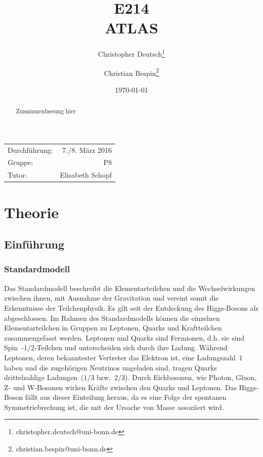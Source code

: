 \documentclass[11pt, a4paper]{article}
\title{E214 \\ ATLAS}
\author{Christopher Deutsch\footnote{christopher.deutsch@uni-bonn.de} \and Christian Bespin\footnote{christian.bespin@uni-bonn.de}}
\date{\today}
\numberwithin{equation}{section}
\begin{document}
\begin{titlepage}

\maketitle

\begin{center}
\begin{tabular}{l r}
Durchführung: & 7./8. März 2016 \\
Gruppe: & P8 \\
Tutor: & Elisabeth Schopf
\end{tabular}
\end{center}

\begin{abstract}
\noindent Zusammenfassung hier
\end{abstract}

\end{titlepage}

\tableofcontents
\newpage

\section{Theorie}

\subsection{Einführung}

\subsubsection{Standardmodell}

Das Standardmodell beschreibt die Elementarteilchen und die Wechselwirkungen zwischen ihnen, mit Ausnahme der Gravitation und vereint somit die Erkenntnisse der Teilchenphysik.
Es gilt seit der Entdeckung des Higgs-Bosons als abgeschlossen.
Im Rahmen des Standardmodells können die einzelnen Elementarteilchen in Gruppen zu Leptonen, Quarks und Kraftteilchen zusammengefasst werden.
Leptonen und Quarks sind Fermionen, d.h. sie sind Spin~-$1/2$-Teilchen und unterscheiden sich durch ihre Ladung.
Während Leptonen, deren bekanntester Vertreter das Elektron ist, eine Ladungszahl~$1$ haben und die zugehörigen Neutrinos ungeladen sind, tragen Quarks drittelzahlige Ladungen~($1/3$ bzw.~$2/3$).
Durch Eichbosonen, wie Photon, Gluon, Z- und W-Bosonen wirken Kräfte zwischen den Quarks und Leptonen.
Das Higgs-Boson fällt aus dieser Einteilung heraus, da es eine Folge der spontanen Symmetriebrechung ist, die mit der Ursache von Masse assoziiert wird.
\end{document}
